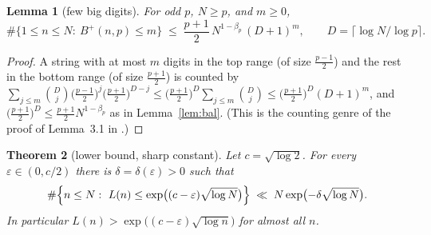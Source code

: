 \documentclass[11pt]{article}
\newtheorem{theorem}{Theorem}
\newtheorem{lemma}[theorem]{Lemma}
\newcommand{\eps}{\varepsilon}
\begin{document}
\begin{lemma}[few big digits]\label{lem:big}
For odd $p$, $N\ge p$, and $m\ge0$,
\[
\#\{1\le n\le N:\ B^+(n,p)\le m\}\;\le\;
\frac{p+1}2\,N^{1-\beta_p}\,(D+1)^m,\qquad D=\lceil\log N/\log p\rceil .
\]
\end{lemma}

\begin{proof}
A string with at most $m$ digits in the top range (of size $\frac{p-1}2$) and
the rest in the bottom range (of size $\frac{p+1}2$) is counted by
$\sum_{j\le m}\binom{D}{j}\bigl(\tfrac{p-1}2\bigr)^{j}
\bigl(\tfrac{p+1}2\bigr)^{D-j}
\le\bigl(\tfrac{p+1}2\bigr)^{D}\sum_{j\le m}\binom Dj
\le\bigl(\tfrac{p+1}2\bigr)^{D}(D+1)^m$,
and $\bigl(\tfrac{p+1}2\bigr)^{D}\le\frac{p+1}2 N^{1-\beta_p}$ as in
Lemma~\ref{lem:bal}.  (This is the counting genre of the proof of Lemma~3.1
in \cite{Pomerance26}.)
\end{proof}

\begin{theorem}[lower bound, sharp constant]\label{thm:lower}
Let $c=\sqrt{\log2}$.  For every $\eps\in(0,c/2)$ there is
$\delta=\delta(\eps)>0$ such that
\[
\#\Bigl\{n\le N:\ L(n)\le\exp\bigl((c-\eps)\sqrt{\log N}\bigr)\Bigr\}
\;\ll\;N\exp\bigl(-\delta\sqrt{\log N}\bigr).
\]
In particular $L(n)>\exp\bigl((c-\eps)\sqrt{\log n}\bigr)$ for almost all
$n$.
\end{theorem}
\end{document}
